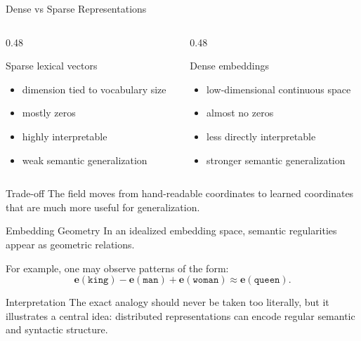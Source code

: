 \documentclass[aspectratio=169]{beamer}
\newcommand{\vect}[1]{\bm{#1}}
\begin{document}
\begin{frame}{Dense vs Sparse Representations}
\begin{columns}[T]
\begin{column}{0.48\textwidth}
\begin{block}{Sparse lexical vectors}
\begin{itemize}
    \item dimension tied to vocabulary size
    \item mostly zeros
    \item highly interpretable
    \item weak semantic generalization
\end{itemize}
\end{block}
\end{column}
\begin{column}{0.48\textwidth}
\begin{block}{Dense embeddings}
\begin{itemize}
    \item low-dimensional continuous space
    \item almost no zeros
    \item less directly interpretable
    \item stronger semantic generalization
\end{itemize}
\end{block}
\end{column}
\end{columns}

\vspace{0.12cm}
\begin{alertblock}{Trade-off}
The field moves from hand-readable coordinates to learned coordinates that are much more useful for generalization.
\end{alertblock}
\end{frame}
%
%
\begin{frame}{Embedding Geometry}
In an idealized embedding space, semantic regularities appear as geometric relations.

\vspace{0.15cm}
For example, one may observe patterns of the form:
\[
\vect{e}(\texttt{king}) - \vect{e}(\texttt{man}) + \vect{e}(\texttt{woman}) \approx \vect{e}(\texttt{queen}).
\]

\vspace{0.15cm}
\begin{block}{Interpretation}
The exact analogy should never be taken too literally, but it illustrates a central idea: distributed representations can encode regular semantic and syntactic structure.
\end{block}

\end{frame}
\end{document}

